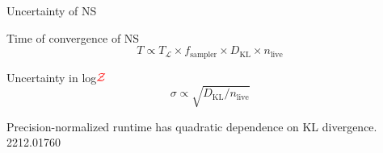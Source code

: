 \documentclass[aspectratio=169, 11pt]{beamer}
\begin{document}

    


\begin{frame}{Uncertainty of NS}

\begin{block}{Time of convergence of NS}
    \begin{equation}
        T \propto T_{\mathcal{L}} \times f_{\textrm{sampler}} \times D_{\textrm{KL}} \times n_{\textrm{live}} 
    \end{equation}
\end{block}
\begin{block}{Uncertainty in log$\textcolor{red}{\mathcal{Z}}$}
    \begin{equation}
        \sigma \propto \sqrt{D_{\textrm{KL}} / n_{\textrm{live}}}
    \end{equation}
\end{block}

\alert{Precision-normalized} runtime has quadratic dependence on KL divergence. \textcolor{cfgrey}{2212.01760}
    
\end{frame}
\end{document}

